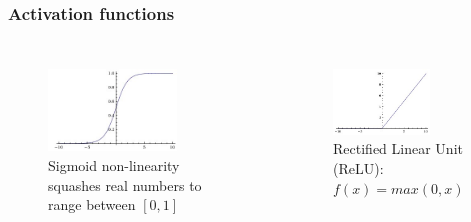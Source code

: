 \begin{frame}
	\frametitle{Activation functions}
	

	\begin{columns}
		\begin{figure}
                	\includegraphics[width=0.7\textwidth]{Pics/sigmoid}\\
			\small{Sigmoid non-linearity squashes real numbers to range between $[0,1]$}
        	\end{figure}
		\begin{figure}
                        \includegraphics[width=0.7\textwidth]{Pics/relu}\\
                        \small{Rectified Linear Unit (ReLU): $f(x)=max(0,x)$}
                \end{figure}

	\end{columns}

\end{frame}

